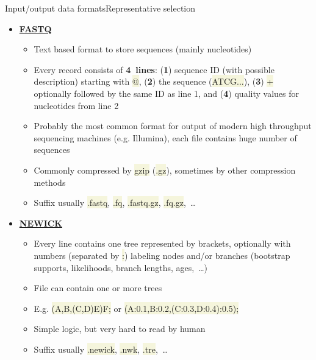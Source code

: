 \documentclass[compress, ucs, xelatex, 11pt, xcolor=svgnames, aspectratio=169,
	hyperref={
		bookmarks=true,
		unicode=true,
		colorlinks=true,
		pdftitle={Molecular data in R},
		plainpages=false,
		pdfauthor={Vojtech Zeisek},
		pdfsubject={Course about phylogeny and evolution in R},
		pdfcreator={XeLaTeX},
		pdfkeywords={R, evolution, phylogeny, molecular data},
		linkcolor=Crimson, %
		anchorcolor=Magenta, %
		citecolor=Magenta, %
		filecolor=Magenta, %
		menucolor=Magenta, %
		urlcolor=DodgerBlue, %
		pdftex},
	url={hyphens, lowtilde} %
	]{beamer}
\renewcommand{\texttt}[1]{\colorbox{Beige}{{\ttfamily #1}}}
\begin{document}
\begin{frame}[allowframebreaks]{Input/output data formats}{Representative selection}
\begin{itemize}
\begin{itemize}
			\item Each sequence can be on single line, on multiple lines
			\item Can store also alignments (practically sequences of same length, with marked gaps and missing data)
			\item Larger sequences are sometimes compressed
			\item Suffix usually \texttt{*.fasta} (generic, also \texttt{*.fas}, \texttt{*.fa}, \texttt{*.seq}, \texttt{*.fsa}), \texttt{*.fna} (nucleic acid), \texttt{*.ffn} (nucleotides, coding regions), \texttt{*.faa} (amino acids), \texttt{*.frn} (non-coding RNA),~\ldots
		\end{itemize}
		\item \href{https://en.wikipedia.org/wiki/FASTQ_format}{\textbf{FASTQ}}
		\begin{itemize}
			\item Text based format to store sequences (mainly nucleotides)
			\item Every record consists of \textbf{4~lines}: (\textbf{1}) sequence ID (with possible description) starting with \texttt{@}, (\textbf{2}) the sequence (\texttt{ATCG...}), (\textbf{3}) \texttt{+} optionally followed by the same ID as line 1, and (\textbf{4}) quality values for nucleotides from line 2
			\item Probably the most common format for output of modern high throughput sequencing machines (e.g. Illumina), each file contains huge number of sequences
			\item Commonly compressed by \texttt{gzip} (\texttt{*.gz}), sometimes by other compression methods
			\item Suffix usually \texttt{*.fastq}, \texttt{*.fq}, \texttt{*.fastq.gz}, \texttt{*.fq.gz},~\ldots
		\end{itemize}
		\item \href{https://en.wikipedia.org/wiki/Newick_format}{\textbf{NEWICK}}
		\begin{itemize}
			\item Every line contains one tree represented by brackets, optionally with numbers (separated by \texttt{:}) labeling nodes and/or branches (bootstrap supports, likelihoods, branch lengths, ages,~\ldots)
			\item File can contain one or more trees
			\item E.g. \texttt{(A,B,(C,D)E)F;} or \texttt{(A:0.1,B:0.2,(C:0.3,D:0.4):0.5);}
			\item Simple logic, but very hard to read by human
			\item Suffix usually \texttt{*.newick}, \texttt{*.nwk}, \texttt{*.tre},~\ldots

\end{itemize}
\end{itemize}
\end{frame}
\end{document}
